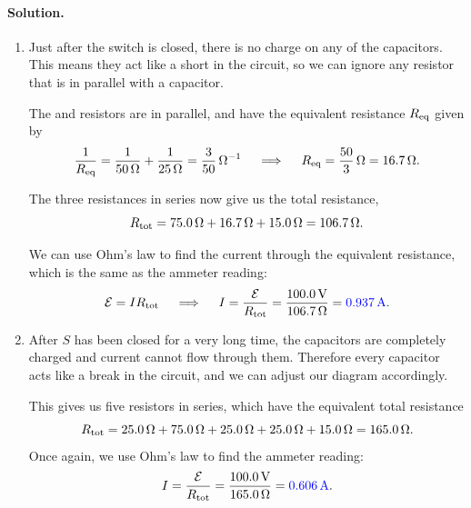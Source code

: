 \documentclass[11pt]{article}
\newcommand{\beq}{\begin{equation*}}
\newcommand{\eeq}{\end{equation*}}
\newenvironment{solution}
{
    \paragraph{Solution.}
    \ignorespaces
}
{
    \bigskip
}
\begin{document}
\begin{solution}
	\begin{enumerate}
		\item Just after the switch is closed, there is no charge on any of the capacitors.  This means they act like a short in the circuit, so we can ignore any resistor that is in parallel with a capacitor.
		
		\vspace{1.5in}
		
		The  and  resistors are in parallel, and have the equivalent resistance $R_\text{eq}$ given by
		\beq
			\frac{1}{\Req} = \frac{1}{\Sohm{50}} + \frac{1}{\Sohm{25}} = \frac{3}{50}\,\si{\per\ohm}
			\qimplies
			\Req = \frac{50}{3}\,\si{\ohm} = \Sohm{16.7}.
		\eeq
		
		\vspace{1.5in}
		
		The three resistances in series now give us the total resistance,
		\beq
			\Rtot = \Sohm{75.0} + \Sohm{16.7} + \Sohm{15.0}
			= \Sohm{106.7}.
		\eeq
		
		\vspace{1.5in}
		
		We can use Ohm's law to find the current through the equivalent resistance, which is the same as the ammeter reading:
		\beq
			\cE = I \Rtot
			\qimplies
			I = \frac{\cE}{\Rtot}
			= \frac{\Svolt{100.0}}{\Sohm{106.7}}
			= {\color{blue} \Samp{0.937}}.
		\eeq
		
		\item After $S$ has been closed for a very long time, the capacitors are completely charged and current cannot flow through them.  Therefore every capacitor acts like a break in the circuit, and we can adjust our diagram accordingly.
		
		\vspace{1.5in}
		
		This gives us five resistors in series, which have the equivalent total resistance
		\beq
			\Rtot = \Sohm{25.0} + \Sohm{75.0} + \Sohm{25.0} + \Sohm{25.0} + \Sohm{15.0}
			= \Sohm{165.0}.
		\eeq
		Once again, we use Ohm's law to find the ammeter reading:
		\beq
			I = \frac{\cE}{\Rtot}
			= \frac{\Svolt{100.0}}{\Sohm{165.0}}
			= {\color{blue} \Samp{0.606}}.
		\eeq
	\end{enumerate}
\end{solution}



\clearpage

\newcommand{\PcE}{P_\cE}
\newcommand{\dt}{\dd{t}}
\newcommand{\PR}{P_R}
\newcommand{\intoi}{\int_0^\infty}
\newcommand{\UC}{U_C}
\newcommand{\UcE}{U_\cE}
\newcommand{\UR}{U_R}
\end{document}
